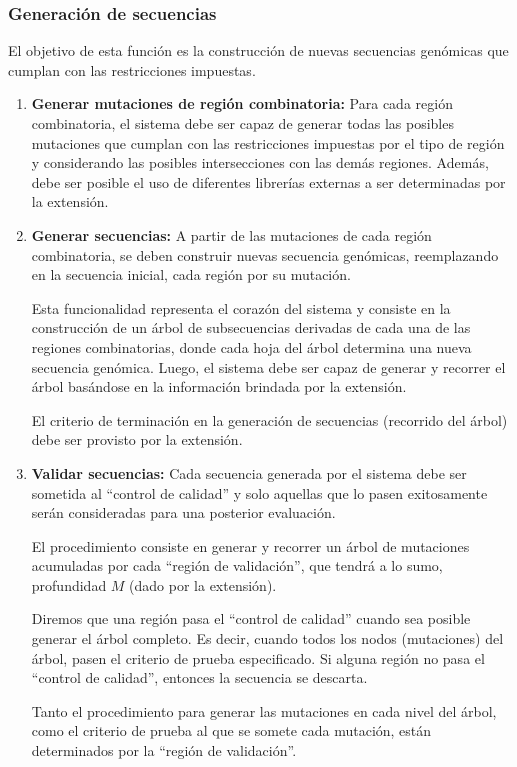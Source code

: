 \documentclass[10pt,a4paper]{article}
\begin{document}
  \subsubsection{Generaci\'on de secuencias}
  El objetivo de esta funci\'on es la construcci\'on de nuevas secuencias
gen\'omicas que cumplan con las restricciones impuestas.
  \begin{enumerate}
    \item \textbf{Generar mutaciones de regi\'on combinatoria:}
    Para cada regi\'on combinatoria, el sistema debe ser capaz de generar todas
las posibles mutaciones que cumplan con las restricciones impuestas por el tipo
de regi\'on y considerando las posibles intersecciones con las dem\'as regiones.
Adem\'as, debe ser posible el uso de diferentes librer\'ias externas a ser
determinadas por la extensi\'on.
    
    \item \textbf{Generar secuencias:}
    A partir de las mutaciones de cada regi\'on combinatoria, se deben construir
nuevas secuencia gen\'omicas, reemplazando en la secuencia inicial, cada
regi\'on por su mutaci\'on.

    Esta funcionalidad representa el coraz\'on del sistema y consiste en la
construcci\'on de un \'arbol de subsecuencias derivadas de cada una de las
regiones combinatorias, donde cada hoja del \'arbol determina una nueva
secuencia gen\'omica. Luego, el sistema debe ser capaz de generar y recorrer el
\'arbol bas\'andose en la informaci\'on brindada por la extensi\'on.

    El criterio de terminaci\'on en la generaci\'on de secuencias (recorrido del
\'arbol) debe ser provisto por la extensi\'on.

    \item \textbf{Validar secuencias:}
    Cada secuencia generada por el sistema debe ser sometida al ``control de
calidad'' y solo aquellas que lo pasen exitosamente ser\'an consideradas para
una posterior evaluaci\'on.    

    El procedimiento consiste en generar y recorrer un \'arbol de mutaciones
acumuladas por cada ``regi\'on de validaci\'on'', que tendr\'a a lo sumo,
profundidad $M$ (dado por la extensi\'on). 

    Diremos que una regi\'on pasa el ``control de calidad'' cuando sea posible
generar el \'arbol completo. Es decir, cuando todos los nodos (mutaciones) del
\'arbol, pasen el criterio de prueba especificado. Si alguna regi\'on no pasa el
``control de calidad'', entonces la secuencia se descarta.

    Tanto el procedimiento para generar las mutaciones en cada nivel del
\'arbol, como el criterio de prueba al que se somete cada mutaci\'on, est\'an
determinados por la ``regi\'on de validaci\'on''.
  \end{enumerate}
\end{document}
